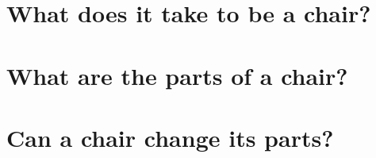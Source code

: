 \documentclass[12pt,twoside]{reedfancy}
\begin{document}
\begin{spacing}{1.25}
\chapter{What does it take to be a chair?}


\chapter{What are the parts of a chair?}


\chapter{Can a chair change its parts?}



	



  \backmatter %




\end{spacing}
\end{document}
